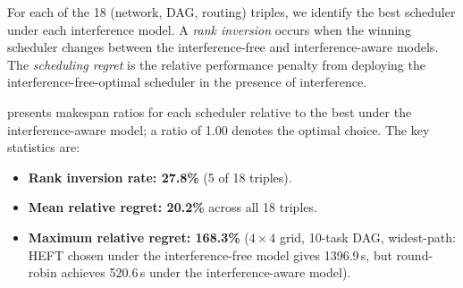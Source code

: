 \documentclass[conference]{IEEEtran}
\begin{document}
For each of the 18 (network, DAG, routing) triples, we identify the best
scheduler under each interference model.  A \emph{rank inversion} occurs
when the winning scheduler changes between the interference-free and
interference-aware models.  The \emph{scheduling regret} is the relative
performance penalty from deploying the interference-free-optimal scheduler
in the presence of interference.

 presents makespan ratios for each scheduler
relative to the best under the interference-aware model; a ratio of 1.00 denotes the
optimal choice.  The key statistics are:
\begin{itemize}[itemsep=1pt,leftmargin=*]
\item \textbf{Rank inversion rate: 27.8\%} (5 of 18 triples).
\item \textbf{Mean relative regret: 20.2\%} across all 18 triples.
\item \textbf{Maximum relative regret: 168.3\%} ($4\times4$ grid,
  10-task DAG, widest-path: HEFT chosen under the interference-free
  model gives 1396.9\,s, but round-robin achieves 520.6\,s under the
  interference-aware model).
\end{itemize}
\end{document}

